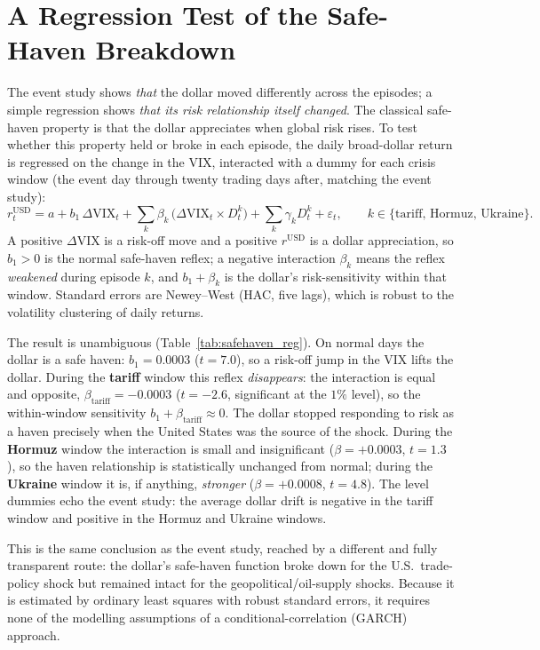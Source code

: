 
\section{A Regression Test of the Safe-Haven Breakdown}
\label{sec:safehaven_regression}

The event study shows \emph{that} the dollar moved differently across the episodes; a
simple regression shows \emph{that its risk relationship itself changed}. The classical
safe-haven property is that the dollar appreciates when global risk rises. To test whether
this property held or broke in each episode, the daily broad-dollar return is regressed on
the change in the VIX, interacted with a dummy for each crisis window (the event day through
twenty trading days after, matching the event study):
%
\begin{equation}
  r^{\text{USD}}_{t} = a + b_1\,\Delta\mathrm{VIX}_t
     + \sum_{k}\beta_k\,\bigl(\Delta\mathrm{VIX}_t \times D^{k}_t\bigr)
     + \sum_{k}\gamma_k D^{k}_t + \varepsilon_t,
  \qquad k \in \{\text{tariff},\,\text{Hormuz},\,\text{Ukraine}\}.
\end{equation}
%
A positive $\Delta\mathrm{VIX}$ is a risk-off move and a positive $r^{\text{USD}}$ is a
dollar appreciation, so $b_1>0$ is the normal safe-haven reflex; a negative interaction
$\beta_k$ means the reflex \emph{weakened} during episode $k$, and $b_1+\beta_k$ is the
dollar's risk-sensitivity within that window. Standard errors are Newey--West (HAC, five
lags), which is robust to the volatility clustering of daily returns.



The result is unambiguous (Table~\ref{tab:safehaven_reg}). On normal days the dollar is a
safe haven: $b_1 = 0.0003$ ($t=7.0$), so a risk-off jump in the VIX lifts the dollar. During
the \textbf{tariff} window this reflex \emph{disappears}: the interaction is equal and
opposite, $\beta_{\text{tariff}} = -0.0003$ ($t=-2.6$, significant at the $1\%$ level), so the
within-window sensitivity $b_1+\beta_{\text{tariff}} \approx 0$. The dollar stopped responding
to risk as a haven precisely when the United States was the source of the shock. During the
\textbf{Hormuz} window the interaction is small and insignificant ($\beta=+0.0003$, $t=1.3$),
so the haven relationship is statistically unchanged from normal; during the \textbf{Ukraine}
window it is, if anything, \emph{stronger} ($\beta=+0.0008$, $t=4.8$). The level dummies
echo the event study: the average dollar drift is negative in the tariff window and positive
in the Hormuz and Ukraine windows.

This is the same conclusion as the event study, reached by a different and fully transparent
route: the dollar's safe-haven function broke down for the U.S.\ trade-policy shock but
remained intact for the geopolitical/oil-supply shocks. Because it is estimated by ordinary
least squares with robust standard errors, it requires none of the modelling assumptions of
a conditional-correlation (GARCH) approach.
